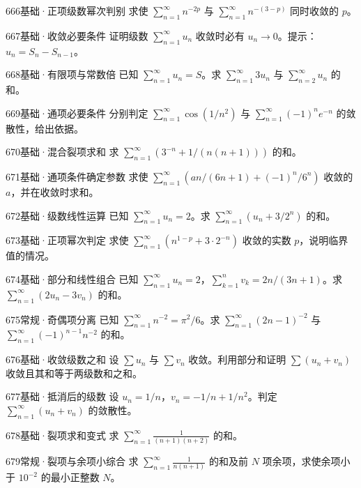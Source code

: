 \begin{exercise}{666}{基础·正项级数幂次判别}
求使 $\sum_{n=1}^{\infty}n^{-2p}$ 与 $\sum_{n=1}^{\infty}n^{-(3-p)}$ 同时收敛的 $p$。
\end{exercise}
\begin{exercise}{667}{基础·收敛必要条件}
证明级数 $\sum_{n=1}^{\infty}u_n$ 收敛时必有 $u_n\to0$。提示：$u_n=S_n-S_{n-1}$。
\end{exercise}
\begin{exercise}{668}{基础·有限项与常数倍}
已知 $\sum_{n=1}^{\infty}u_n=S$。求 $\sum_{n=1}^{\infty}3u_n$ 与 $\sum_{n=2}^{\infty}u_n$ 的和。
\end{exercise}
\begin{exercise}{669}{基础·通项必要条件}
分别判定 $\sum_{n=1}^{\infty}\cos(1/n^2)$ 与 $\sum_{n=1}^{\infty}(-1)^ne^{-n}$ 的敛散性，给出依据。
\end{exercise}
\begin{exercise}{670}{基础·混合裂项求和}
求 $\sum_{n=1}^{\infty}(3^{-n}+1/(n(n+1)))$ 的和。
\end{exercise}
\begin{exercise}{671}{基础·通项条件确定参数}
求使 $\sum_{n=1}^{\infty}(an/(6n+1)+(-1)^n/6^n)$ 收敛的 $a$，并在收敛时求和。
\end{exercise}
\begin{exercise}{672}{基础·级数线性运算}
已知 $\sum_{n=1}^{\infty}u_n=2$。求 $\sum_{n=1}^{\infty}(u_n+3/2^n)$ 的和。
\end{exercise}
\begin{exercise}{673}{基础·正项幂次判定}
求使 $\sum_{n=1}^{\infty}(n^{1-p}+3\cdot2^{-n})$ 收敛的实数 $p$，说明临界值的情况。
\end{exercise}
\begin{exercise}{674}{基础·部分和线性组合}
已知 $\sum_{n=1}^{\infty}u_n=2$，$\sum_{k=1}^nv_k=2n/(3n+1)$。求 $\sum_{n=1}^{\infty}(2u_n-3v_n)$ 的和。
\end{exercise}
\begin{exercise}{675}{常规·奇偶项分离}
已知 $\sum_{n=1}^{\infty}n^{-2}=\pi^2/6$。求 $\sum_{n=1}^{\infty}(2n-1)^{-2}$ 与 $\sum_{n=1}^{\infty}(-1)^{n-1}n^{-2}$ 的和。
\end{exercise}
\begin{exercise}{676}{基础·收敛级数之和}
设 $\sum u_n$ 与 $\sum v_n$ 收敛。利用部分和证明 $\sum(u_n+v_n)$ 收敛且其和等于两级数和之和。
\end{exercise}
\begin{exercise}{677}{基础·抵消后的级数}
设 $u_n=1/n$，$v_n=-1/n+1/n^2$。判定 $\sum_{n=1}^{\infty}(u_n+v_n)$ 的敛散性。
\end{exercise}
\begin{exercise}{678}{基础·裂项求和变式}
求 $\sum_{n=1}^{\infty}\frac1{(n+1)(n+2)}$ 的和。
\end{exercise}
\begin{exercise}{679}{常规·裂项与余项小综合}
求 $\sum_{n=1}^{\infty}\frac1{n(n+1)}$ 的和及前 $N$ 项余项，求使余项小于 $10^{-2}$ 的最小正整数 $N$。
\end{exercise}

